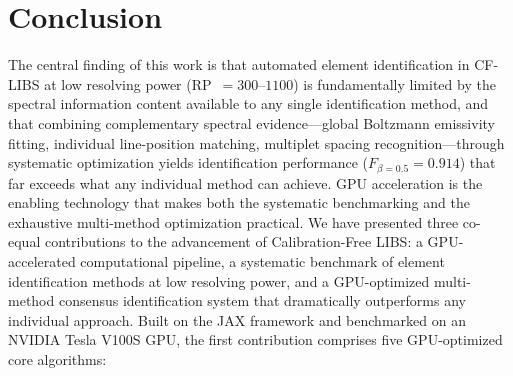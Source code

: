 \section{Conclusion}
\label{sec:conclusion}

The central finding of this work is that automated element identification in CF-LIBS at low resolving power (RP~$= 300$--$1100$) is fundamentally limited by the spectral information content available to any single identification method, and that combining complementary spectral evidence---global Boltzmann emissivity fitting, individual line-position matching, multiplet spacing recognition---through systematic optimization yields identification performance ($F_{\beta=0.5} = 0.914$) that far exceeds what any individual method can achieve.
GPU acceleration is the enabling technology that makes both the systematic benchmarking and the exhaustive multi-method optimization practical.
We have presented three co-equal contributions to the advancement of Calibration-Free LIBS: a GPU-accelerated computational pipeline, a systematic benchmark of element identification methods at low resolving power, and a GPU-optimized multi-method consensus identification system that dramatically outperforms any individual approach.
Built on the JAX framework and benchmarked on an NVIDIA Tesla V100S GPU, the first contribution comprises five GPU-optimized core algorithms:

